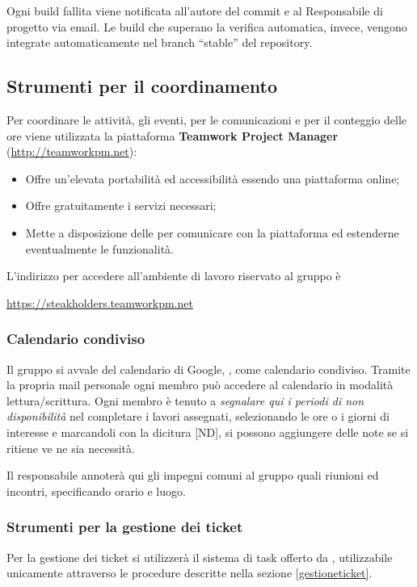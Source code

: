 	Ogni build fallita viene notificata all'autore del commit e al Responsabile di progetto via email. Le build che superano la verifica automatica, invece, vengono integrate automaticamente nel branch ``stable'' del repository.
	

	\subsection{Strumenti per il coordinamento}
\label{teamworkpm}

	Per coordinare le attività, gli eventi, per le comunicazioni e per il conteggio delle ore viene utilizzata la piattaforma \textbf{Teamwork Project Manager} (\url{http://teamworkpm.net}):
	\begin{itemize}
		\item Offre un'elevata portabilità ed accessibilità essendo una piattaforma online;
		\item Offre gratuitamente i servizi necessari;
		\item Mette a disposizione delle  per comunicare con la piattaforma ed estenderne eventualmente le funzionalità.
	\end{itemize}
	
	L'indirizzo per accedere all'ambiente di lavoro riservato al gruppo è
	\begin{center}
		\url{https://steakholders.teamworkpm.net}
	\end{center}
	
	\subsubsection{Calendario condiviso}
	\label{Calendario condiviso}
			
	Il gruppo si avvale del calendario di Google, , come calendario condiviso.
	Tramite la propria mail personale ogni membro può accedere al calendario in modalità lettura/scrittura.
	Ogni membro è tenuto a \emph{segnalare qui i periodi di non disponibilità} nel completare i lavori assegnati, selezionando le ore o i giorni di interesse e marcandoli con la dicitura [ND], si possono aggiungere delle note se si ritiene ve ne sia necessità. 
	
	Il responsabile annoterà qui gli impegni comuni al gruppo quali riunioni ed incontri, specificando orario e luogo.
	
	\subsubsection{Strumenti per la gestione dei ticket}
	\label{teamwork}
	Per la gestione dei ticket si utilizzerà il sistema di task offerto da , utilizzabile unicamente attraverso le procedure descritte nella sezione \ref{gestioneticket}.
	
